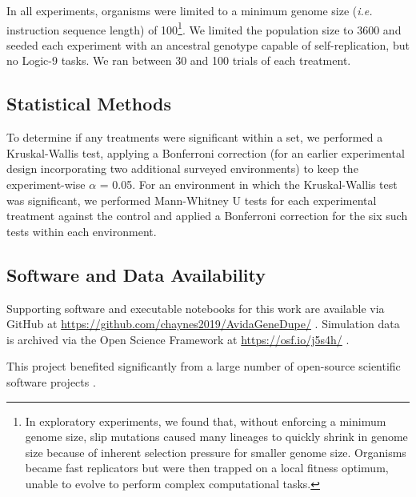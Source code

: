 In all experiments, organisms were limited to a minimum genome size (\textit{i.e.} instruction sequence length) of 100\footnote{
In exploratory experiments, we found that, without enforcing a minimum genome size, slip mutations caused many lineages to quickly shrink in genome size because of inherent selection pressure for smaller genome size. Organisms became fast replicators but were then trapped on a local fitness optimum, unable to evolve to perform complex computational tasks.
}.
We limited the population size to 3600 and seeded each experiment with an ancestral genotype capable of self-replication, but no Logic-9 tasks.
We ran between 30 and 100 trials of each treatment.

\subsection{Statistical Methods}

To determine if any treatments were significant within a set, we performed a Kruskal-Wallis test, applying a Bonferroni correction (for an earlier experimental design incorporating two additional surveyed environments) to keep the experiment-wise $\alpha$ = 0.05.
For an environment in which the Kruskal-Wallis test was significant, we performed Mann-Whitney U tests for each experimental treatment against the control and applied a Bonferroni correction for the six such tests within each environment.

\subsection{Software and Data Availability} \label{sec:materials}

Supporting software and executable notebooks for this work are available via GitHub at \url{https://github.com/chaynes2019/AvidaGeneDupe/} \citep{david_m_bryson_2025_14911296}.
Simulation data is archived via the Open Science Framework at \url{https://osf.io/j5s4h/} \citep{foster2017open}.

This project benefited significantly from a large number of open-source scientific software projects \citep{2020SciPy-NMeth,harris2020array,reback2020pandas,mckinney-proc-scipy-2010,waskom2021seaborn,hunter2007matplotlib,moreno2023teeplot,r_core_team_r:_2015}.
